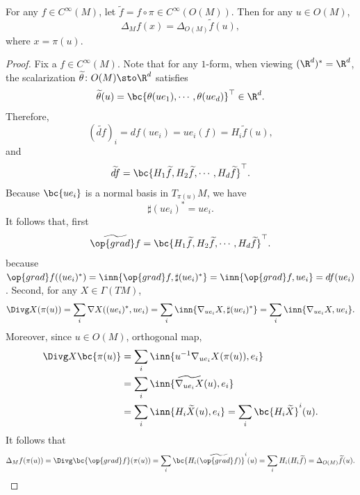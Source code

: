 \begin{prop}
    For any $f \in C^\infty(M)$, let $\widetilde{f} = f \circ \pi \in C^\infty(O(M))$. Then for any $u \in O(M)$,
    \begin{equation*}
        \Delta_M f(x) = \Delta_{O(M)} \widetilde{f}(u),
    \end{equation*}
    where $x  = \pi(u)$.
\end{prop}
\begin{proof}
    Fix a $f \in C^\infty(M)$. Note that for any $1$-form, when viewing $(\R^d)^* = \R^d$, the scalarization $\widetilde{\theta} \colon O(M) \sto \R^d$ satisfies
    \begin{equation*}
        \widetilde{\theta}(u) = \bc{\theta(ue_1),\cdots,\theta(ue_d)}^\top \in \R^d.
    \end{equation*}
    Therefore, 
    \begin{equation*}
        (\widetilde{df})_i = df(ue_i) = ue_i(f) = H_i\widetilde{f}(u),
    \end{equation*}
    and
    \begin{equation*}
        \widetilde{df} = \bc{H_1\widetilde{f},H_2\widetilde{f},\cdots,H_d\widetilde{f}}^\top.
    \end{equation*}
    Because $\bc{ue_i}$ is a normal basis in $T_{\pi(u)}M$, we have
    \begin{equation*}
        \sharp(ue_i)^* = ue_i.
    \end{equation*}
    It follows that, first
    \begin{equation*}
        \widetilde{\op{grad}f} = \bc{H_1\widetilde{f},H_2\widetilde{f},\cdots,H_d\widetilde{f}}^\top.
    \end{equation*}
    because $\op{grad} f((ue_i)^*) = \inn{\op{grad} f, \sharp(ue_i)^*} = \inn{\op{grad} f,ue_i} = df(ue_i)$. Second, for any $X \in \Gamma(TM)$,
    \begin{equation*}
        \Divg X(\pi(u)) = \sum_i \nabla X((ue_i)^*,ue_i) = \sum_i \inn{\nabla_{ue_i}X,\sharp (ue_i)^*} = \sum_i \inn{\nabla_{ue_i}X, ue_i}.
    \end{equation*}
    Moreover, since $u \in O(M)$, orthogonal map,
    \begin{align*}
        \Divg X\bc{\pi(u)} &= \sum_i \inn{u^{-1}\nabla_{ue_i}X(\pi(u)), e_i} \\
        &= \sum_i \inn{\widetilde{\nabla_{ue_i}X}(u),e_i} \\
        &= \sum_i \inn{H_i\widetilde{X}(u),e_i} = \sum_i \bc{H_i\widetilde{X}}^i(u).
    \end{align*}
    It follows that
    \begin{equation*}
        \Delta_M f(\pi(u)) = \Divg \bc{\op{grad}f}(\pi(u)) = \sum_i \bc{H_i(\widetilde{\op{grad} f})}^i(u) = \sum_iH_i(H_i \widetilde{f}) = \Delta_{O(M)} \widetilde{f}(u). \qedhere
    \end{equation*}
\end{proof}

